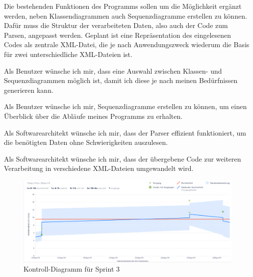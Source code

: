 Die bestehenden Funktionen des Programms sollen um die Möglichkeit ergänzt werden, neben Klassendiagrammen auch Sequenzdiagramme erstellen zu können. Dafür muss die Struktur der verarbeiteten Daten, also auch der Code zum Parsen, angepasst werden. Geplant ist eine Repräsentation des eingelesenen Codes als zentrale XML-Datei, die je nach Anwendungszweck wiederum die Basis für zwei unterschiedliche XML-Dateien ist.






\nsecend %

Als Benutzer wünsche ich mir, dass eine Auswahl zwischen Klassen- und Sequenzdiagrammen möglich ist, damit ich diese je nach meinen Bedürfnissen generieren kann.
\nsecend

Als Benutzer wünsche ich mir, Sequenzdiagramme erstellen zu können, um einen Überblick über die Abläufe meines Programms zu erhalten.
\nsecend
\nsecend%

Als Softwarearchitekt wünsche ich mir, dass der Parser effizient funktioniert, um die benötigten Daten ohne Schwierigkeiten auszulesen.
\nsecend

Als Softwarearchitekt wünsche ich mir, dass der übergebene Code zur weiteren Verarbeitung in verschiedene XML-Dateien umgewandelt wird.
\nsecend
\nsecend%
\nsecend %

\begin{figure}[hbtp]
\centering
\includegraphics[width=\textwidth]{Bilder/KD-Jira.png}
\caption{Kontroll-Diagramm für Sprint 3}
\end{figure}
\nsecend%

